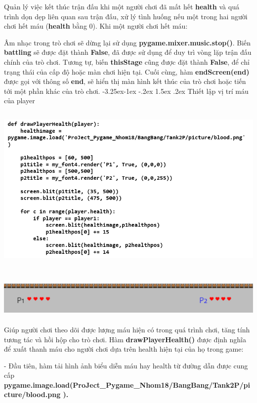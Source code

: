 \documentclass[a4paper]{article}
\makeatletter
\newcounter {subsubsubsection}[subsubsection]
\newcommand\subsubsubsection{\@startsection{subsubsubsection}{4}{\z@}%
                                     {-3.25ex\@plus -1ex \@minus -.2ex}%
                                     {1.5ex \@plus .2ex}%
                                     {\normalfont\normalsize\bfseries}}
\makeatother
\begin{document}
Quản lý việc kết thúc trận đấu khi một người chơi đã mất hết
\textbf{health} và quá trình dọn dẹp liên quan sau trận đấu, xử lý tình
huống nếu một trong hai người chơi hết máu (\textbf{health} bằng 0). Khi
một người chơi hết máu:

Âm nhạc trong trò chơi sẽ dừng lại sử dụng
\textbf{pygame.mixer.music.stop()}. Biến \textbf{battling} sẽ được đặt
thành \textbf{False}, đã được sử dụng để duy trì vòng lặp trận đấu chính
của trò chơi. Tương tự, biến \textbf{thisStage} cũng được đặt thành
\textbf{False}, để chỉ trạng thái của cấp độ hoặc màn chơi hiện tại.
Cuối cùng, hàm \textbf{endScreen(end)} được gọi với thông số
\textbf{end}, sẽ hiển thị màn hình kết thúc của trò chơi hoặc tiến tới
một phần khác của trò chơi.
\subsubsubsection{Thiết lập vị trí máu của player}
\includegraphics[width=6in,height=3.5in]{image55_1.png}

\includegraphics[width=6.3in,height=0.7375in]{image56.png}

Giúp người chơi theo dõi được lượng máu hiện có trong quá trình chơi,
tăng tính tương tác và hồi hộp cho trò chơi. Hàm
\textbf{drawPlayerHealth()} được định nghĩa để xuất thanh máu cho người
chơi dựa trên health hiện tại của họ trong game:

- Đầu tiên, hàm tải hình ảnh biểu diễn máu hay health từ đường dẫn được
cung cấp\\
\textbf{pygame.image.load(\textquotesingle ProJect\_Pygame\_Nhom18/BangBang/Tank2P/picture/blood.png\textquotesingle{}
).}
\end{document}
